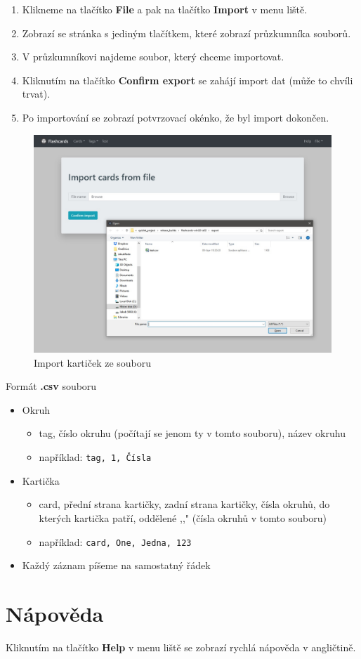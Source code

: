 \documentclass[11pt]{article}
\providecommand{\tightlist}{\setlength{\itemsep}{1pt}\setlength{\parskip}{1pt}}
\let\oldtexttt\texttt
\renewcommand{\texttt}[1]{\oldtexttt{\textcolor{codehighlight}{#1}}}
\begin{document}
\begin{enumerate}
\def\labelenumi{\arabic{enumi}.}
\tightlist
\item
  Klikneme na tlačítko \textbf{File} a pak na tlačítko \textbf{Import} v
  menu liště.
\item
  Zobrazí se stránka s jediným tlačítkem, které zobrazí průzkumníka
  souborů.
\item
  V průzkumníkovi najdeme soubor, který chceme importovat.
\item
  Kliknutím na tlačítko \textbf{Confirm export} se zahájí import dat
  (může to chvíli trvat).
\item
  Po importování se zobrazí potvrzovací okénko, že byl import dokončen.
\end{enumerate}

\begin{figure}
\centering
\includegraphics{../../../../assets/import.jpg}
\caption{Import kartiček ze souboru}
\end{figure}

Formát \textbf{.csv} souboru

\begin{itemize}
\tightlist
\item
  Okruh

  \begin{itemize}
  \tightlist
  \item
    tag, číslo okruhu (počítají se jenom ty v tomto souboru), název
    okruhu
  \item
    například: \texttt{tag,\ 1,\ Čísla}
  \end{itemize}
\item
  Kartička

  \begin{itemize}
  \tightlist
  \item
    card, přední strana kartičky, zadní strana kartičky, čísla okruhů,
    do kterých kartička patří, oddělené ,,\textbar{}" (čísla okruhů v
    tomto souboru)
  \item
    například: \texttt{card,\ One,\ Jedna,\ 1\textbar{}2\textbar{}3}
  \end{itemize}
\item
  Každý záznam píšeme na samostatný řádek
\end{itemize}

\hypertarget{nuxe1povux11bda}{%
\section{Nápověda}\label{nuxe1povux11bda}}

Kliknutím na tlačítko \textbf{Help} v menu liště se zobrazí rychlá
nápověda v angličtině.
\clearpage

\end{document}

